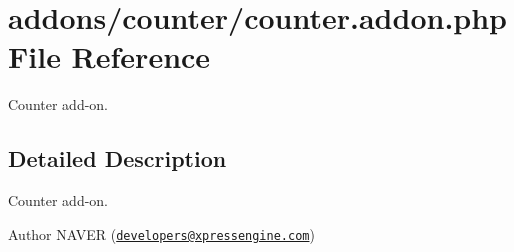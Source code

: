 \hypertarget{counter_8addon_8php}{}\section{addons/counter/counter.addon.\+php File Reference}
\label{counter_8addon_8php}


Counter add-\/on.  




\subsection{Detailed Description}
Counter add-\/on. 

\begin{DoxyAuthor}{Author}
N\+A\+V\+E\+R (\href{mailto:developers@xpressengine.com}{\tt developers@xpressengine.\+com}) 
\end{DoxyAuthor}
